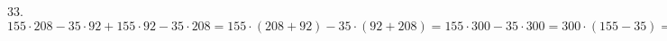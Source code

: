 33. $155\cdot208-35\cdot92+155\cdot92-35\cdot208=155\cdot(208+92)-35\cdot(92+208)=155\cdot300-35\cdot300=300\cdot(155-35)=300\cdot120=36000.$\\
